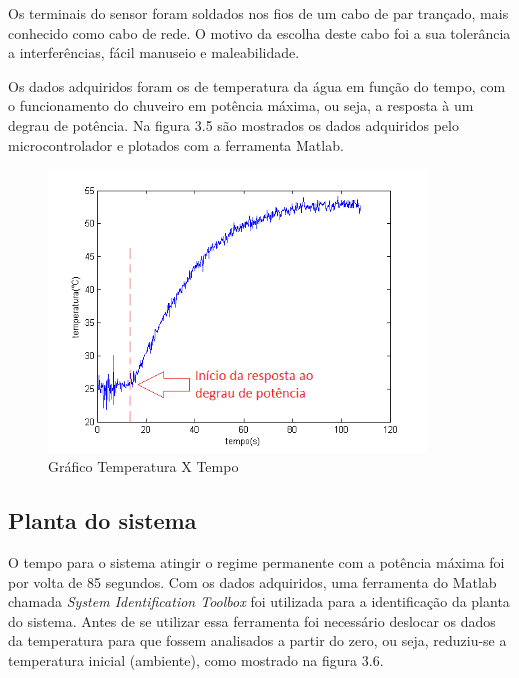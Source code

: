 \noindent Os terminais do sensor foram soldados nos fios de um cabo de par trançado, mais conhecido como cabo de rede. O motivo da escolha deste cabo foi a sua tolerância a interferências, fácil manuseio e maleabilidade.

Os dados adquiridos foram os de temperatura da água em função do tempo, com o funcionamento do chuveiro em potência máxima, ou seja, a resposta à um degrau de potência. Na figura 3.5 são mostrados os dados adquiridos pelo microcontrolador e plotados com a ferramenta Matlab.

\begin{figure}[!htb]

\center

\includegraphics[width=10cm]{imagens/temperatura_por_tempo_reduzido_ambiente.png}

\label{Gráfico Temperatura X Tempo}

\caption{Gráfico Temperatura X Tempo}

\end{figure}

\subsection{Planta do sistema}

\noindent O tempo para o sistema atingir o regime permanente com a potência máxima foi por volta de 85 segundos.
Com os dados adquiridos, uma ferramenta do Matlab chamada \textit{System Identification Toolbox} foi utilizada para a identificação da planta do sistema. Antes de se utilizar essa ferramenta foi necessário deslocar os dados da temperatura para que fossem analisados a partir do zero, ou seja, reduziu-se a temperatura inicial (ambiente), como mostrado na figura 3.6.

